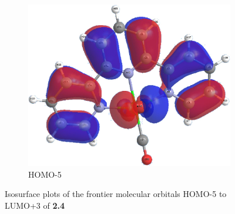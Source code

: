 \begin{figure}[!ht]
\begin{subfigure}[b]{0.31\textwidth}
  \includegraphics[clip=true, width=\textwidth, keepaspectratio]{images/mos/4h-5.eps}
  \caption{HOMO-5}
 \end{subfigure}
\caption[Molecular orbitals HOMO-5 to LUMO+3 of \textbf{2.4}]{Isosurface plots of the frontier molecular orbitals HOMO-5 to LUMO+3 of \textbf{2.4}}
\label{fig.mo24}
\end{figure}

